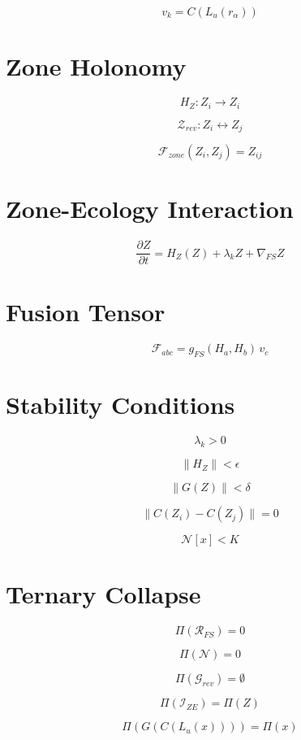 \[
v_k = C(L_u(r_\alpha))
\]


\section*{Zone Holonomy}

\[
H_Z : Z_i \to Z_i
\]

\[
\mathcal{Z}_{rev} : Z_i \leftrightarrow Z_j
\]

\[
\mathcal{F}_{zone}(Z_i, Z_j) = Z_{ij}
\]


\section*{Zone-Ecology Interaction}

\[
\frac{\partial Z}{\partial t}
= H_Z(Z)
+ \lambda_k Z
+ \nabla_{FS} Z
\]


\section*{Fusion Tensor}

\[
\mathcal{F}_{abc}
= g_{FS}(H_a, H_b)\, v_c
\]


\section*{Stability Conditions}

\[
\lambda_k > 0
\]

\[
\|H_Z\| < \epsilon
\]

\[
\|G(Z)\| < \delta
\]

\[
\|C(Z_i) - C(Z_j)\| = 0
\]

\[
\mathcal{N}[x] < K
\]


\section*{Ternary Collapse}

\[
\Pi(\mathcal{R}_{FS}) = 0
\]

\[
\Pi(\mathcal{N}) = 0
\]

\[
\Pi(\mathcal{G}_{rev}) = \emptyset
\]

\[
\Pi(\mathcal{I}_{ZE}) = \Pi(Z)
\]

\[
\Pi(G(C(L_u(x)))) = \Pi(x)
\]

